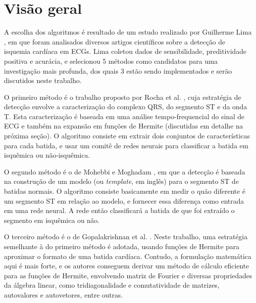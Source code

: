 
\section{Visão geral}
\label{sec:section1}

A escolha dos algoritmos é resultado de um estudo realizado por Guilherme Lima \cite{Lima01}, em que foram analisados diversos artigos científicos sobre a detecção de isquemia cardíaca em ECGs. Lima coletou dados de sensibilidade, preditividade positiva e acurácia, e selecionou 5 métodos como candidatos para uma investigação mais profunda, dos quais 3 estão sendo implementados e serão discutidos neste trabalho.

O primeiro método é o trabalho proposto por Rocha et al. \cite{Rocha10}, cuja estratégia de detecção envolve a caracterização do complexo QRS, do segmento ST e da onda T. Esta caracterização é baseada em uma análise tempo-frequencial do sinal de ECG e também na expansão em funções de Hermite (discutidas em detalhe na próxima seção). O algoritmo consiste em extrair dois conjuntos de características para cada batida, e usar um comitê de redes neurais para classificar a batida em isquêmica ou não-isquêmica.

O segundo método é o de Mohebbi e Moghadam \cite{Mohebbi07}, em que a detecção é baseada na construção de um modelo (ou \emph{template}, em inglês) para o segmento ST de batidas normais. O algoritmo consiste basicamente em medir o quão diferente é um segmento ST em relação ao modelo, e fornecer essa diferença como entrada em uma rede neural. A rede então classificará a batida de que foi extraído o segmento em isquêmica ou não.

O terceiro método é o de Gopalakrishnan et al. \cite{Gopalak04}. Neste trabalho, uma estratégia semelhante à do primeiro método é adotada, usando funções de Hermite para aproximar o formato de uma batida cardíaca. Contudo, a formulação matemática aqui é mais forte, e os autores conseguem derivar um método de cálculo eficiente para as funções de Hermite, envolvendo matriz de Fourier e diversas propriedades da álgebra linear, como tridiagonalidade e comutatividade de matrizes, autovalores e autovetores, entre outras.